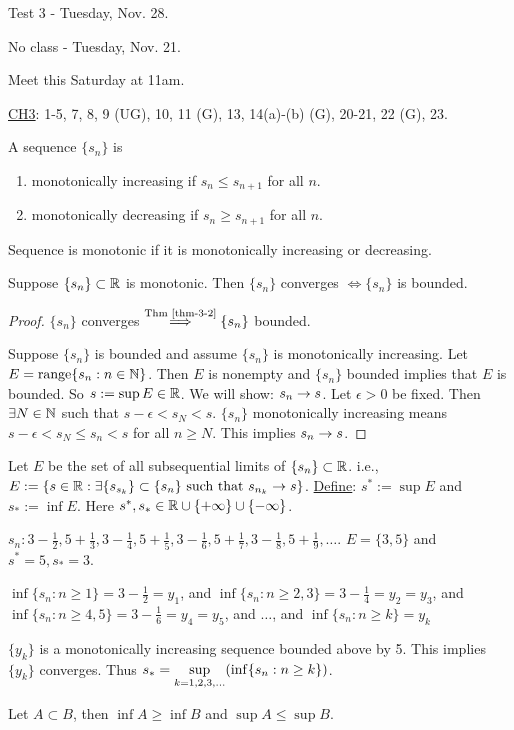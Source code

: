 \documentclass[]{article}
\begin{document}
Test 3 - Tuesday, Nov. 28.

No class - Tuesday, Nov. 21.

Meet this Saturday at 11am.

\ul{CH3}: 1-5, 7, 8, 9 (UG), 10, 11 (G), 13, 14(a)-(b) (G), 20-21, 22 (G), 23.

\begin{definition}
	A sequence $\{s_n\}$ is
	\begin{enumerate}
		\item monotonically increasing if $s_n\leq s_{n+1}$ for all $n$.
		\item monotonically decreasing if $s_n\geq s_{n+1}$ for all $n$.
	\end{enumerate}
	Sequence is monotonic if it is monotonically increasing or decreasing.
\end{definition}
\begin{theorem}
	Suppose $\{s_n\}\subset\mathbb{R}$ is monotonic. Then $\{s_n\}$ converges $\iff \{s_n\}$ is bounded.
\end{theorem}
\begin{proof}
	\say{$\implies$} $\{s_n\}$ converges $\overset{\text{Thm \ref{thm-3-2}}}{\implies} \{s_n\}$ bounded.

	\say{$\Lla$} Suppose $\{s_n\}$ is bounded and assume $\{s_n\}$ is monotonically increasing.
	Let $E = \text{range}\{s_n:n\in\mathbb{N}\}$. Then $E$ is nonempty and $\{s_n\}$ bounded implies that $E$ is bounded.
	So $s:=\sup E\in\mathbb{R}$. We will show: $s_n\rightarrow s$.
	Let $\epsilon>0$ be fixed. Then $\exists N\in\mathbb{N}$ such that $s-\epsilon< s_N< s$.
	$\{s_n\}$ monotonically increasing means $s-\epsilon< s_N\leq s_n < s$ for all $n\geq N$.
	This implies $s_n\rightarrow s$.
\end{proof}

\begin{definition}
	Let $E$ be the set of all subsequential limits of $\{s_n\}\subset\mathbb{R}$.
	i.e., $E:=\{s\in\mathbb{R}:\exists\{s_{s_k}\}\subset\{s_n\} \text{ such that } s_{n_k}\rightarrow s\}$.
	\ul{Define}: $s^*:= \sup E$ and $s_*:=\inf E$. Here $s^*,s_*\in\mathbb{R}\cup\{+\infty\}\cup\{-\infty\}$.
\end{definition}
\begin{example}
	$s_n: 3-\frac{1}{2},5+\frac{1}{3},3-\frac{1}{4},5+\frac{1}{5},3-\frac{1}{6},5+\frac{1}{7},3-\frac{1}{8},5+\frac{1}{9},\dots$.
	$E = \{3,5\}$ and $s^* = 5, s_* = 3$.

	$\inf\{s_n:n\geq 1\} = 3 - \frac{1}{2} = y_1$, and 
	$\inf\{s_n:n\geq 2,3\} = 3-\frac{1}{4} = y_2=y_3$, and
	$\inf\{s_n:n\geq 4,5\} = 3-\frac{1}{6} = y_4=y_5$, and 
	$\dots$, and
	$\inf\{s_n:n\geq k\} = y_k$
	\begin{note}
		$\{y_k\}$ is a monotonically increasing sequence bounded above by 5.
		This implies $\{y_k\}$ converges.
		Thus $s_* = \underset{k=1,2,3,\dots}{\sup}(\inf\{s_n:n\geq k\})$.
	\end{note}
\end{example}
\begin{recall}
	Let $A\subset B$, then $\inf A\geq \inf B$ and $\sup A\leq \sup B$.
\end{recall}
\end{document}
